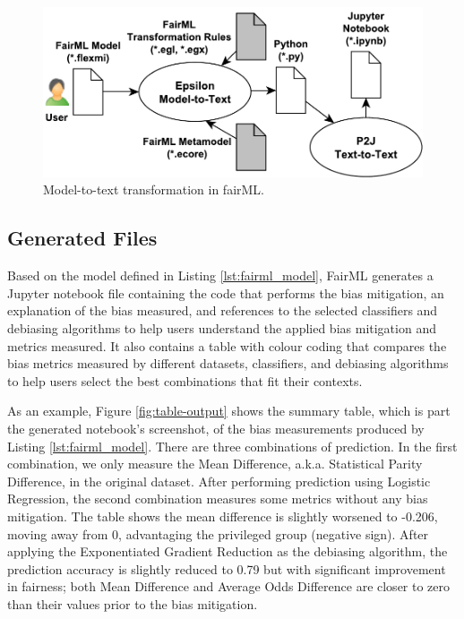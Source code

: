 \documentclass[sigconf]{acmart}
\begin{document}
{	\begin{figure}
		\includegraphics[width=\linewidth]{figures/transformation}
		\caption{Model-to-text transformation in fairML.}
		\label{fig:transformation}
	\end{figure}
	
	\subsection{Generated Files}
	\label{sec:generated_files}
	Based on the model defined in Listing \ref{lst:fairml_model}, FairML generates a Jupyter notebook file containing the code that performs the bias mitigation, an explanation of the bias measured, and references to the selected classifiers and debiasing algorithms to help users understand the applied bias mitigation and metrics measured. It also contains a table with colour coding that compares the bias metrics measured by different datasets, classifiers, and debiasing algorithms to help users select the best combinations that fit their contexts. 
	
	 As an example, Figure \ref{fig:table-output} shows the summary table, which is part the generated notebook's screenshot, of the bias measurements produced by Listing \ref{lst:fairml_model}. 
	There are three combinations of prediction. In the first combination, we only measure the Mean Difference, a.k.a. Statistical Parity Difference, in the original dataset. After performing prediction using Logistic Regression, the second combination measures some metrics without any bias mitigation. The table shows the mean difference is slightly worsened to -0.206, moving away from 0, advantaging the privileged group (negative sign). After applying the Exponentiated Gradient Reduction as the debiasing algorithm, the prediction accuracy is slightly reduced to 0.79 but with significant improvement in fairness; both Mean Difference and Average Odds Difference are closer to zero than their values prior to the bias mitigation.
		
}
\end{document}
